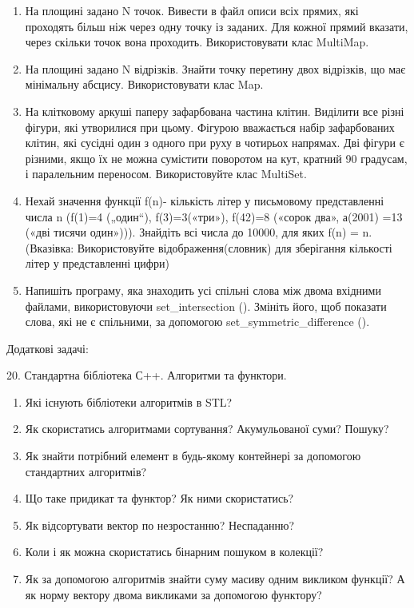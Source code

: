 \documentclass[]{article}
\begin{document}
\begin{enumerate}
\def\labelenumi{\arabic{enumi})}
\item
  На площині задано N точок. Вивести в файл описи всіх прямих, які
  проходять більш ніж через одну точку із заданих. Для кожної прямий
  вказати, через скільки точок вона проходить. Використовувати клас
  MultiMap.
\item
  На площині задано N відрізків. Знайти точку перетину двох відрізків,
  що має мінімальну абсцису. Використовувати клас Map.
\item
  На клітковому аркуші паперу зафарбована частина клітин. Виділити все
  різні фігури, які утворилися при цьому. Фігурою вважається набір
  зафарбованих клітин, які сусідні один з одного при руху в чотирьох
  напрямах. Дві фігури є різними, якщо їх не можна сумістити поворотом
  на кут, кратний 90 градусам, і паралельним переносом. Використовуйте
  клас MultiSet.
\item
  Нехай значення функції f(n)- кількість літер у письмовому
  представленні числа n (f(1)=4 („один``), f(3)=3(«три»), f(42)=8
  («сорок два», а(2001) =13 («дві тисячи один»))). Знайдіть всі числа до
  10000, для яких f(n) = n. (Вказівка: Використовуйте
  відображення(словник) для зберігання кількості літер у представленні
  цифри)
\item
  Напишіть програму, яка знаходить усі спільні слова між двома вхідними
  файлами, використовуючи set\_intersection (). Змініть його, щоб
  показати слова, які не є спільними, за допомогою
  set\_symmetric\_difference ().
\end{enumerate}

Додаткові задачі:

20. Стандартна бібліотека С++. Алгоритми та функтори.

\begin{enumerate}
\def\labelenumi{\arabic{enumi})}
\item
  Які існують бібліотеки алгоритмів в STL?
\item
  Як скористатись алгоритмами сортування? Акумульованої суми? Пошуку?
\item
  Як знайти потрібний елемент в будь-якому контейнері за допомогою
  стандартних алгоритмів?
\item
  Що таке придикат та функтор? Як ними скористатись?
\item
  Як відсортувати вектор по незростанню? Неспаданню?
\item
  Коли і як можна скористатись бінарним пошуком в колекції?
\item
  Як за допомогою алгоритмів знайти суму масиву одним викликом функції?
  А як норму вектору двома викликами за допомогою функтору?
\end{enumerate}
\end{document}
